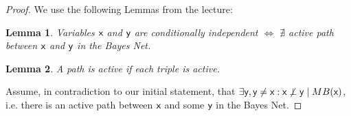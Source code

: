 \documentclass[12pt,a4paper,oneside]{article}
\newtheorem{lem}{Lemma}
\newcommand{\LR}{\Leftrightarrow}
\begin{document}
\begin{proof}

\noindent
We use the following Lemmas from the lecture:

\begin{lem}
Variables $\rv{x}$ and $\rv{y}$ are conditionally independent $\LR$ $\nexists$ active path between $\rv{x}$ and $\rv{y}$ in the Bayes Net.
\end{lem}

\begin{lem}
A path is active if each triple is active.
\end{lem}


\noindent
Assume, in contradiction to our initial statement, that $\exists \rv{y}, \rv{y} \neq \rv{x}: \rv{x} \not\perp \rv{y} \; | \; MB(\rv{x})$, i.e. there is an active path between $\rv{x}$ and some $\rv{y}$ in the Bayes Net.


\end{proof}
\end{document}
